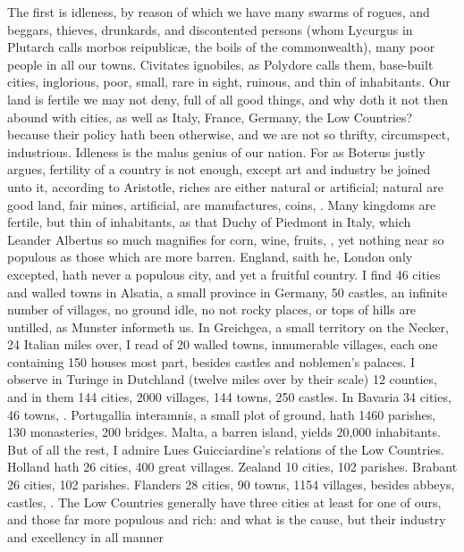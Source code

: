 {The first is idleness, by reason of which we have many swarms of
rogues, and beggars, thieves, drunkards, and discontented persons (whom
Lycurgus in Plutarch calls morbos reipublic\ae{}, the boils of the
commonwealth), many poor people in all our towns. Civitates ignobiles,
as Polydore calls them, base-built cities, inglorious, poor,
small, rare in sight, ruinous, and thin of inhabitants. Our land is
fertile we may not deny, full of all good things, and why doth it not
then abound with cities, as well as Italy, France, Germany, the Low
Countries? because their policy hath been otherwise, and we are not so
thrifty, circumspect, industrious. Idleness is the malus genius of our
nation. For as Boterus justly argues, fertility of a country is
not enough, except art and industry be joined unto it, according to
Aristotle, riches are either natural or artificial; natural are good
land, fair mines, \etc{} artificial, are manufactures, coins, \etc{}. Many
kingdoms are fertile, but thin of inhabitants, as that Duchy of
Piedmont in Italy, which Leander Albertus so much magnifies for corn,
wine, fruits, \etc{}, yet nothing near so populous as those which are more
barren. England, saith he, London only excepted, hath never a
populous city, and yet a fruitful country. I find 46 cities and walled
towns in Alsatia, a small province in Germany, 50 castles, an infinite
number of villages, no ground idle, no not rocky places, or tops of
hills are untilled, as Munster informeth us. In Greichgea, a
small territory on the Necker, 24 Italian miles over, I read of 20
walled towns, innumerable villages, each one containing 150 houses most
part, besides castles and noblemen's palaces. I observe in Turinge
in Dutchland (twelve miles over by their scale) 12 counties, and in
them 144 cities, 2000 villages, 144 towns, 250 castles. In Bavaria
34 cities, 46 towns, \etc{}. Portugallia interamnis, a small plot of
ground, hath 1460 parishes, 130 monasteries, 200 bridges. Malta, a
barren island, yields 20,000 inhabitants. But of all the rest, I admire
Lues Guicciardine's relations of the Low Countries. Holland hath 26
cities, 400 great villages. Zealand 10 cities, 102 parishes. Brabant 26
cities, 102 parishes. Flanders 28 cities, 90 towns, 1154 villages,
besides abbeys, castles, \etc{}. The Low Countries generally have three
cities at least for one of ours, and those far more populous and rich:
and what is the cause, but their industry and excellency in all manner
}

